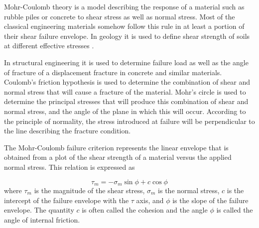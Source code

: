 Mohr-Coulomb theory is a model describing the response of a material such as rubble piles or concrete to shear stress as well as normal stress. 
Most of the classical engineering materials somehow follow this rule in at least a portion of their shear failure envelope. In geology it is used to define shear strength of soils at different effective stresses \cite{hand69}.

In structural engineering it is used to determine failure load as well as the angle of fracture of a displacement fracture in concrete and similar materials. Coulomb's friction hypothesis is used to determine the combination of shear and normal stress that will cause a fracture of the material. Mohr's circle is used to determine the principal stresses that will produce this combination of shear and normal stress, and the angle of the plane in which this will occur. According to the principle of normality, the stress introduced at failure will be perpendicular to the line describing the fracture condition.


The Mohr-Coulomb failure criterion represents the linear envelope that is obtained from a plot of the shear strength of a material 
versus the applied normal stress. This relation is expressed as \cite[p219]{owhi}



\begin{equation}
\tau_m = -\sigma_m \sin \phi + c \cos \phi  \label{eq:mccrit}
\end{equation}
where $\tau_m$ is the magnitude of the shear stress, 
$\sigma_m$ is the normal stress, $c$ is the intercept of the failure envelope with the $\tau$ axis, 
and $\phi$ is the slope of the failure envelope. 
The quantity $c$ is often called the cohesion and the angle $\phi$ is called the angle of internal friction.
 
